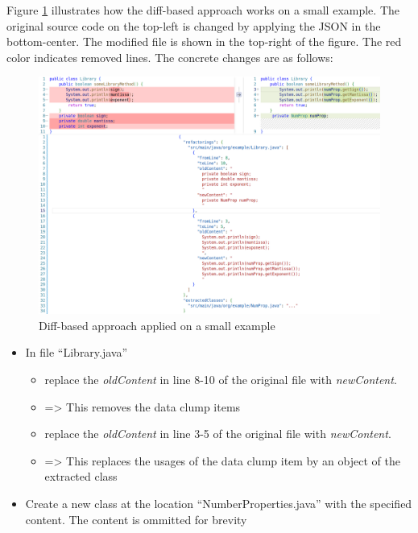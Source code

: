 Figure \ref{fig:json_based_changes} illustrates how the diff-based approach works on a small example. The original source code on the top-left is changed by applying the JSON in the bottom-center. The modified file is shown in the top-right of the figure. The red color indicates removed lines. The concrete changes are as follows:
\begin{figure}
    \centering
    \includegraphics[width=\columnwidth]{figures/chapter4/diff_original_changed_vscode_cmp.png}
    \caption{Diff-based approach applied on a small example}
    \label{fig:json_based_changes}
\end{figure}


\begin{itemize}
    \item In file \enquote{Library.java}
    \begin{itemize}
        \item replace the \textit{oldContent} in line 8-10 of the original file with \textit{newContent}.
        \item => This removes the data clump items
       \item replace the \textit{oldContent} in line 3-5 of the original file with \textit{newContent}.
        \item => This replaces the usages of the data clump item by an object of the extracted class 
    \end{itemize}
    \item Create a new class at the location \enquote{NumberProperties.java} with the specified content. The content is ommitted for brevity
\end{itemize}



